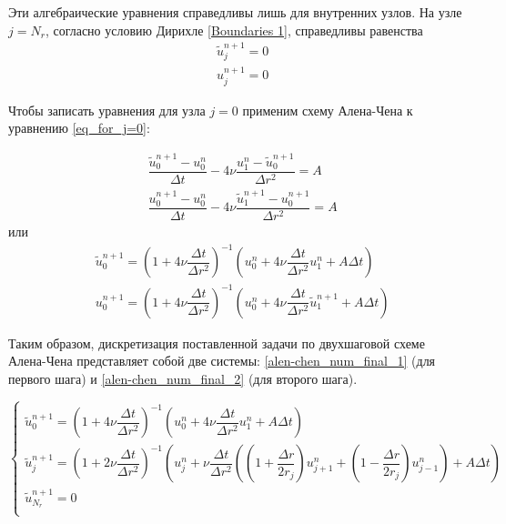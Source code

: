 Эти алгебраические уравнения справедливы лишь для внутренних узлов. 
На узле $j=N_r$, согласно условию Дирихле \eqref{Boundaries 1}, справедливы равенства
\begin{align}
	& \tilde{u}_j^{n+1} = 0 \\
	& u_j^{n+1} = 0
\end{align}

Чтобы записать уравнения для узла $j=0$ применим схему Алена-Чена к уравнению \eqref{eq_for_j=0}:

\begin{align}
	&\dfrac{\tilde{u}_0^{n+1} - u_0^n}{\Delta t} - 4 \nu \dfrac{u_{1}^n - \tilde{u}_0^{n+1}}{\Delta r^2} = A \\
	&\dfrac{u_0^{n+1} - u_0^n}{\Delta t} - 4 \nu \dfrac{\tilde{u}_1^{n+1} - u_0^{n+1}}{\Delta r^2} = A
\end{align}
или
\begin{align}
	&\tilde{u}_0^{n+1} = \left( 1 + 4 \nu \dfrac{\Delta t}{\Delta r^2} \right)^{-1} \left( u_0^n + 4 \nu \dfrac{\Delta t}{\Delta r^2} u_1^n + A \Delta t \right) \\
	&u_0^{n+1} = \left( 1 + 4 \nu \dfrac{\Delta t}{\Delta r^2} \right)^{-1} \left( u_0^n + 4 \nu \dfrac{\Delta t}{\Delta r^2} \tilde{u}_1^{n+1} + A\Delta t \right)
\end{align}

Таким образом, дискретизация поставленной задачи по двухшаговой схеме Алена-Чена представляет собой две системы: \eqref{alen-chen_num_final_1} (для первого шага) и \eqref{alen-chen_num_final_2} (для второго шага).

\begin{equation} \label{alen-chen_num_final_1}
	\begin{cases}
		\tilde{u}_0^{n+1} = \left( 1 + 4 \nu \dfrac{\Delta t}{\Delta r^2} \right)^{-1} \left( u_0^n + 4 \nu \dfrac{\Delta t}{\Delta r^2} u_1^n + A \Delta t \right) \\
		\tilde{u}_j^{n+1} = \left( 1 + 2 \nu \dfrac{\Delta t}{\Delta r^2} \right)^{-1} \left( u_j^n + \nu \dfrac{\Delta t}{\Delta r^2} 
		\left( \left( 1 + \dfrac{\Delta r}{2 r_j} \right) u_{j+1}^n + \left( 1 - \dfrac{\Delta r}{2 r_j} \right) u_{j-1}^n \right)  + A\Delta t  \right)\\
		\tilde{u}_{N_r}^{n+1} = 0 \\
	\end{cases}
\end{equation}


